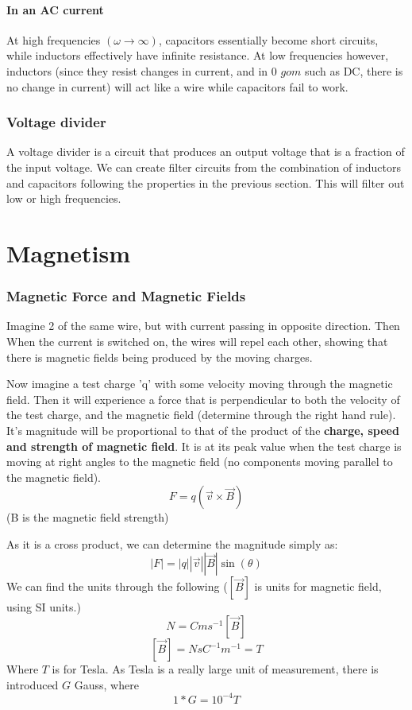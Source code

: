 \documentclass[10pt]{report}
\begin{document}
{{{}
\subsubsection{In an AC current}
\par{
At high frequencies $\left(\omega\to\infty\right)$, capacitors essentially become short circuits, while inductors effectively have infinite resistance. At low frequencies however, inductors (since they resist changes in current, and in 0 $gom$ such as DC, there is no change in current) will act like a wire while capacitors fail to work.
}
\subsection{Voltage divider}
\par{A voltage divider is a circuit that produces an output voltage that is a fraction of the input voltage. We can create filter circuits from the combination of inductors and capacitors following the properties in the previous section. This will filter out low or high frequencies.}

\chapter{Magnetism}
\subsection{Magnetic Force and Magnetic Fields}
\par{Imagine 2 of the same wire, but with current passing in opposite direction. Then When the current is switched on, the wires will repel each other, showing that there is magnetic fields being produced by the moving charges.

Now imagine a test charge 'q' with some velocity moving through the magnetic field. Then it will experience a force that is perpendicular to both the velocity of the test charge, and the magnetic field (determine through the right hand rule). It's magnitude will be proportional to that of the product of the \textbf{charge, speed and strength of magnetic field}. It is at its peak value when the test charge is moving at right angles to the magnetic field (no components moving parallel to the magnetic field). \[
	F=q\left(\vec{v}\times \vec{B}\right)
\] 
(B is the magnetic field strength)

As it is a cross product, we can determine the magnitude simply as: \[
	\left|F\right|=\left|q\right|\left|\vec{v}\right|\left|\vec{B}\right|\sin\left(\theta\right)
\] 
We can find the units through the following ($\left[\vec{B}\right]$ is units for magnetic field, using SI units.) \[
	N=Cms^{-1}\left[\vec{B}\right]
\] \[
\left[\vec{B}\right]=NsC^{-1}m^{-1}=T
\] 
Where $T$ is for Tesla. As Tesla is a really large unit of measurement, there is introduced  $G$ Gauss, where  \[
1*G=10^{-4}T
\] 
}
}}
\end{document}
